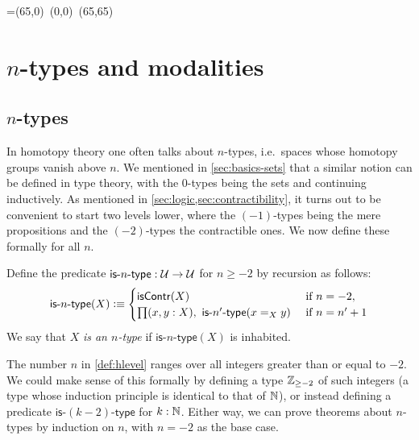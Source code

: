 \newbox\pbbox
\setbox\pbbox=\hbox{\xy \POS(65,0)\ar@{-} (0,0) \ar@{-} (65,65)\endxy}
\def\pb{\save[]+<3.5mm,-3.5mm>*{\copy\pbbox} \restore}

\newcommand{\comp}[2]{\ensuremath{{#2} \circ {#1}}}
\newcommand{\contr}{\ensuremath{\mathsf{contr}}}
\newcommand{\istype}[1]{\mathsf{is}\mbox{-}{#1}\mbox{-}\mathsf{type}}
\newcommand{\nplusone}{\ensuremath{(n+1)}}
\newcommand{\nminusone}{\ensuremath{(n-1)}}

\renewcommand{\P}{\ensuremath{\mathsf{P}}\xspace}
\newcommand{\reflect}{\mathsf{r}}
\newcommand{\project}{\mathsf{p}}
\newcommand{\ext}{\mathsf{ext}}


\chapter{\texorpdfstring{$n$}{n}-types and modalities}
\label{cha:hlevels}

\section{$n$-types}

In homotopy theory one often talks about $n$-types, i.e.\ spaces whose homotopy groups vanish above $n$.
We mentioned in \autoref{sec:basics-sets} that a similar notion can be defined in type theory, with the $0$-types being the sets and continuing inductively.
As mentioned in \autoref{sec:logic,sec:contractibility}, it turns out to be convenient to start two levels lower, where the $(-1)$-types being the mere propositions and the $(-2)$-types the contractible ones.
We now define these formally for all $n$.

\begin{defn}\label{def:hlevel}
  Define the predicate $\istype{n} : \type \to \type$ for $n \geq -2$ by recursion as follows:
  \[ \istype{n}(X) \defeq
  \begin{cases}
    \iscontr(X) & \text{ if } n = -2 , \\
    \prd{x,y : X} \istype{n'}(\id[X]{x}{y}) & \text{ if } n = n'+1
  \end{cases}
  \]
  We say that $X$ \emph{is an $n$-type} if $\istype{n}(X)$ is inhabited.
\end{defn}

\begin{rmk}
  The number $n$ in \autoref{def:hlevel} ranges over all integers greater than or equal to $-2$.
  We could make sense of this formally by defining a type $\mathbb{Z}_{{\geq}-2}$ of such integers (a type whose induction principle is identical to that of $\mathbb{N}$), or instead defining a predicate $\istype{(k-2)}$ for $k : \mathbb{N}$.
  Either way, we can prove theorems about $n$-types by induction on $n$, with $n = -2$ as the base case.
\end{rmk}

